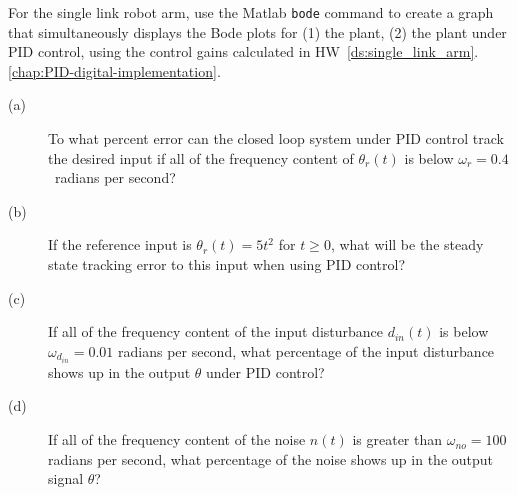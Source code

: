 For the single link robot arm, use the Matlab \texttt{bode} command to create a graph that simultaneously displays the Bode plots for (1) the plant, (2) the plant under PID control, using the control gains calculated in HW~\ref{ds:single_link_arm}.\ref{chap:PID-digital-implementation}.  
\begin{description}
\item[(a)]  To what percent error can the closed loop system under PID control track the desired input if all of the frequency content of $\theta_r(t)$ is below
$\omega_r = 0.4$~radians per second?
\item[(b)] If the reference input is $\theta_r(t) = 5t^2$ for $t\geq 0$, what will be the steady state tracking error to this input when using PID control?
\item[(c)] If all of the frequency content of the input disturbance $d_{in}(t)$ is below $\omega_{d_{in}} = 0.01$ radians per second, what percentage of the input disturbance shows up in the output $\theta$ under PID control?
\item[(d)] If all of the frequency content of the noise $n(t)$ is greater than $\omega_{no} = 100$ radians per second, what percentage of the noise shows up in the output signal $\theta$?
\end{description}
